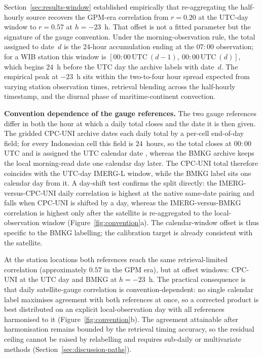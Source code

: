 Section~\ref{sec:results-window} established empirically that
re-aggregating the half-hourly source recovers the GPM-era
correlation from $r = 0.20$ at the UTC-day window to $r = 0.57$ at
$h = -23$~h. That offset is not a fitted parameter but the
signature of the gauge convention. Under the morning-observation
rule, the total assigned to date~$d$ is the 24-hour accumulation
ending at the $07{:}00$ observation; for a WIB station this window
is $[00{:}00\,\text{UTC}\ (d{-}1),\ 00{:}00\,\text{UTC}\ (d)]$,
which begins $24$~h before the UTC day the archive labels with
date~$d$. The empirical peak at $-23$~h sits within the two-to-four
hour spread expected from varying station observation times,
retrieval blending across the half-hourly timestamp, and the
diurnal phase of maritime-continent convection.

\textbf{Convention dependence of the gauge references.} The two
gauge references differ in both the hour at which a daily total
closes and the date it is then given. The
gridded CPC-UNI archive dates each daily total by a per-cell
end-of-day field; for every Indonesian cell this field is
$24$~hours, so the total closes at $00{:}00$ UTC and is assigned
the UTC calendar date \citep{ref:cpcuni_readme}, whereas the BMKG
archive keeps the local morning-read date one calendar day later.
The CPC-UNI total therefore coincides with the UTC-day IMERG-L
window, while the BMKG label sits one calendar day from it. A day-shift
test confirms the split directly: the IMERG-versus-CPC-UNI daily
correlation is highest at the native same-date pairing and falls
when CPC-UNI is shifted by a day, whereas the IMERG-versus-BMKG
correlation is highest only after the satellite is re-aggregated
to the local-observation window (Figure~\ref{fig:convention}a).
The calendar-window offset is thus specific to the BMKG
labelling; the calibration target is already consistent with the
satellite.

At
the station locations both references reach the same
retrieval-limited correlation (approximately $0.57$ in the GPM
era), but at offset windows: CPC-UNI at the UTC day and BMKG at
$h = -23$~h. The practical consequence is that daily
satellite-gauge correlation is convention-dependent: no single
calendar label maximises agreement with both references at once,
so a corrected product is best distributed on an explicit
local-observation day with all references harmonised to it
(Figure~\ref{fig:convention}b). The
agreement attainable after harmonisation remains bounded by the
retrieval timing accuracy, so the residual ceiling cannot be
raised by relabelling and requires sub-daily or multivariate
methods (Section~\ref{sec:discussion-paths}).

